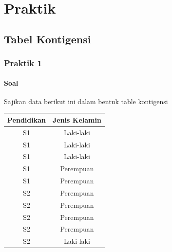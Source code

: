 \documentclass[a4paper,12pt]{article}
\begin{document}
\section{Praktik}
\subsection{Tabel Kontigensi}
\subsubsection{Praktik 1}
\paragraph{Soal\\}
Sajikan data berikut ini dalam bentuk table kontigensi 
\begin{table}[!ht]
	\begin{tabular}{|c|c|}
		\hline 
		Pendidikan & Jenis Kelamin \\ 
		\hline 
		S1 & Laki-laki \\ 
		\hline 
		S1 & Laki-laki \\ 
		\hline 
		S1 & Laki-laki \\ 
		\hline 
		S1 & Perempuan \\ 
		\hline 
		S1 & Perempuan \\ 
		\hline 
		S2 & Perempuan \\ 
		\hline 
		S2 & Perempuan \\ 
		\hline 
		S2 & Perempuan \\ 
		\hline 
		S2 & Perempuan \\ 
		\hline 
		S2 & Laki-laki \\ 
		\hline 
	\end{tabular}
\end{table} 
\end{document}
